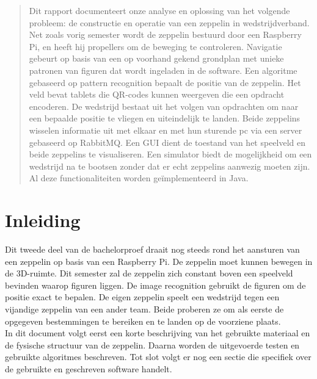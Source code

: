 \documentclass[eind]{penoverslag}
\begin{document}
\maketitlepage


\begin{abstract}
\noindent
Dit rapport documenteert onze analyse en oplossing van het volgende probleem: de constructie en operatie van een zeppelin in wedstrijdverband. Net zoals vorig semester wordt de zeppelin bestuurd door een Raspberry Pi, en heeft hij propellers om de beweging te controleren. Navigatie gebeurt op basis van een op voorhand gekend grondplan met unieke patronen van figuren dat wordt ingeladen in de software. Een algoritme gebaseerd op pattern recognition bepaalt de positie van de zeppelin. Het veld bevat tablets die QR-codes kunnen weergeven die een opdracht encoderen. De wedstrijd bestaat uit het volgen van opdrachten om naar een bepaalde positie te vliegen en uiteindelijk te landen. Beide zeppelins wisselen informatie uit met elkaar en met hun sturende pc via een server gebaseerd op RabbitMQ. Een GUI dient de toestand van het speelveld en beide zeppelins te visualiseren. Een simulator biedt de mogelijkheid om een wedstrijd na te bootsen zonder dat er echt zeppelins aanwezig moeten zijn. Al deze functionaliteiten worden ge\"{i}mplementeerd in Java.\\
\end{abstract}


\tableofcontents\newpage


\section{Inleiding}
Dit tweede deel van de bachelorproef draait nog steeds rond het aansturen van een zeppelin op basis van een Raspberry Pi. De zeppelin moet kunnen bewegen in de 3D-ruimte. Dit semester zal de zeppelin zich constant boven een speelveld bevinden waarop figuren liggen. De image recognition gebruikt de figuren om de positie exact te bepalen. De eigen zeppelin speelt een wedstrijd tegen een vijandige zeppelin van een ander team. Beide proberen ze om als eerste de opgegeven bestemmingen te bereiken en te landen op de voorziene plaats.\\
In dit document volgt eerst een korte beschrijving van het gebruikte materiaal en de fysische structuur van de zeppelin. Daarna worden de uitgevoerde testen en gebruikte algoritmes beschreven. Tot slot volgt er nog een sectie die specifiek over de gebruikte en geschreven software handelt. 
\end{document}
